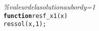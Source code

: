 {\begin{tabbing}
\textit{\%\phantom{x}valeur\phantom{x}de\phantom{x}la\phantom{x}solution\phantom{x}au\phantom{x}bord\phantom{x}y{=}1}\\
\texttt{\textbf{function}}\texttt{\phantom{x}res\phantom{x}{=}\phantom{x}f\_{}x1{(}x{)}}\\
\texttt{res\phantom{x}{=}\phantom{x}sol{(}x{,}1{)}{;}}
\end{tabbing}}
